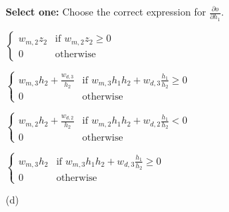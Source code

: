 \begin{questions}
\vspace{1 in}




\question[1]\textbf{Select one:}
Choose the correct expression for $\frac{\partial o}{\partial h_1}$.
\begin{checkboxes}
     \choice $\begin{cases} 
     w_{m,2}z_2 &\text{if $w_{m,2}z_2 \geq 0$}\\
     0 &\text{otherwise}
    \end{cases}$
     
     \choice $\begin{cases} 
     w_{m,3} h_2 +\frac{w_{d,3}}{h_2} &\text{if $w_{m,3} h_1 h_2 +w_{d,3} \frac{h_1}{h_2} \geq 0$}\\
     0 &\text{otherwise}
    \end{cases}$
     
     \choice $\begin{cases} 
     w_{m,2} h_2 +\frac{w_{d,2}}{h_2} &\text{if $w_{m,2} h_1 h_2 +w_{d,2} \frac{h_1}{h_2} < 0$}\\
     0 &\text{otherwise}
    \end{cases}$
     
     \choice $\begin{cases} 
     w_{m,3} h_2 &\text{if $w_{m,3} h_1 h_2 +w_{d,3} \frac{h_1}{h_2} \geq 0$}\\
     0 &\text{otherwise}
    \end{cases}$
    \end{checkboxes}

\begin{soln}
(d)
\end{soln}
\vspace{1 in}


\end{questions}

